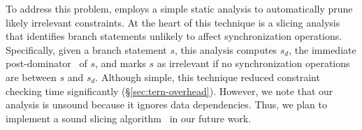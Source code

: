To address this problem, \tern employs a simple static analysis to
automatically prune likely irrelevant constraints.  At the heart of this
technique is a slicing analysis that identifies branch statements unlikely
to affect synchronization operations.  Specifically, given a branch
statement $s$, this analysis computes $s_d$, the immediate
post-dominator~\cite{aho:dragon:06} of $s$, and marks $s$ as irrelevant if
no synchronization operations are between $s$ and $s_d$.  Although simple,
this technique reduced constraint checking time significantly
(\S\ref{sec:tern-overhead}).  However, we note that our analysis is unsound
because it ignores data dependencies.  Thus, we plan to implement a sound
slicing algorithm~\cite{castro:bouncer} in our future work.

















